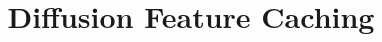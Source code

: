 

\title[Competitor watch \textperiodcentered{} diffusion feature caching \textperiodcentered{} week 38]{Diffusion Feature Caching}
